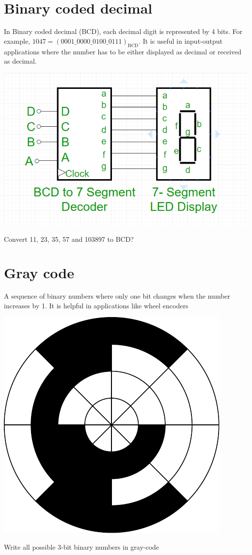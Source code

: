 \section{Binary coded decimal}
In Binary coded decimal (BCD), each decimal digit is represented by 4 bits. For
example, $1047 = (0001\_0000\_0100\_0111)_{\text{BCD}}$. It is useful in
input-output applications where the number has to be either displayed as decimal
or received as decimal.

\includegraphics[width=0.5\linewidth]{bcdto7seg.png}

\begin{prob}
  Convert 11, 23, 35, 57 and 103897 to BCD?
\end{prob}
\vspace{10em}

\section{Gray code}
A sequence of binary numbers where only one bit changes when the number
increases by 1. It is helpful in applications like wheel encoders

\includegraphics[width=0.5\linewidth]{gray-code.pdf}

\begin{prob}
  Write all possible 3-bit binary numbers in gray-code
\end{prob}
\vspace{10em}